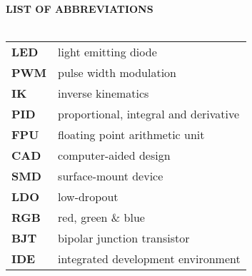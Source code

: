 \newpage
{}
\Large{\textbf{LIST OF ABBREVIATIONS}}\\
\normalsize{}\\
\begin{tabular}{ p{5cm} l}
  \textbf{LED} & light emitting diode\\
  \textbf{PWM} & pulse width modulation\\
  \textbf{IK} & inverse kinematics\\
  \textbf{PID} & proportional, integral and derivative\\
  \textbf{FPU} & floating point arithmetic unit\\
  \textbf{CAD} & computer-aided design\\
  \textbf{SMD} & surface-mount device\\
  \textbf{LDO} & low-dropout\\
  \textbf{RGB} & red, green \& blue\\
  \textbf{BJT} & bipolar junction transistor\\
  \textbf{IDE} & integrated development environment

\end{tabular}